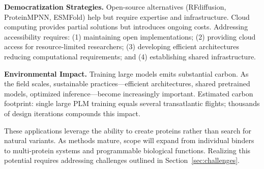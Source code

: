 \textbf{Democratization Strategies.} Open-source alternatives (RFdiffusion, ProteinMPNN, ESMFold) help but require expertise and infrastructure. Cloud computing provides partial solutions but introduces ongoing costs. Addressing accessibility requires: (1) maintaining open implementations; (2) providing cloud access for resource-limited researchers; (3) developing efficient architectures reducing computational requirements; and (4) establishing shared infrastructure.

\textbf{Environmental Impact.} Training large models emits substantial carbon. As the field scales, sustainable practices---efficient architectures, shared pretrained models, optimized inference---become increasingly important. Estimated carbon footprint: single large PLM training equals several transatlantic flights; thousands of design iterations compounds this impact.

\vspace{0.5em}
\noindent
These applications leverage the ability to create proteins rather than search for natural variants. As methods mature, scope will expand from individual binders to multi-protein systems and programmable biological functions. Realizing this potential requires addressing challenges outlined in Section~\ref{sec:challenges}.
